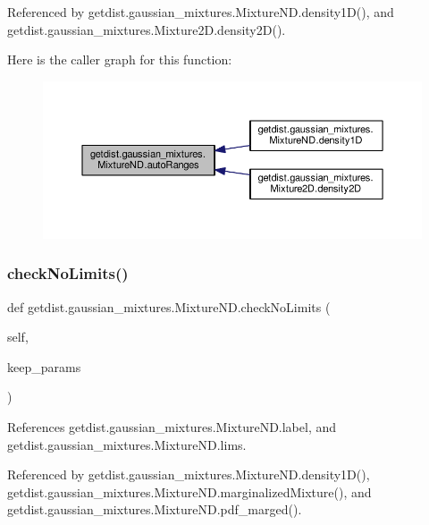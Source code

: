 Referenced by getdist.\+gaussian\+\_\+mixtures.\+Mixture\+N\+D.\+density1\+D(), and getdist.\+gaussian\+\_\+mixtures.\+Mixture2\+D.\+density2\+D().

Here is the caller graph for this function\+:
\nopagebreak
\begin{figure}[H]
\begin{center}
\leavevmode
\includegraphics[width=350pt]{classgetdist_1_1gaussian__mixtures_1_1MixtureND_aaa880a5a80583fb9f416e9fe9d99f25e_icgraph}
\end{center}
\end{figure}
\mbox{\label{classgetdist_1_1gaussian__mixtures_1_1MixtureND_a3878c180b2a99c4a7f257fea5a7a7d0f}} 
\subsubsection{\texorpdfstring{check\+No\+Limits()}{checkNoLimits()}}
{\footnotesize\ttfamily def getdist.\+gaussian\+\_\+mixtures.\+Mixture\+N\+D.\+check\+No\+Limits (\begin{DoxyParamCaption}\item[{}]{self,  }\item[{}]{keep\+\_\+params }\end{DoxyParamCaption})}



References getdist.\+gaussian\+\_\+mixtures.\+Mixture\+N\+D.\+label, and getdist.\+gaussian\+\_\+mixtures.\+Mixture\+N\+D.\+lims.



Referenced by getdist.\+gaussian\+\_\+mixtures.\+Mixture\+N\+D.\+density1\+D(), getdist.\+gaussian\+\_\+mixtures.\+Mixture\+N\+D.\+marginalized\+Mixture(), and getdist.\+gaussian\+\_\+mixtures.\+Mixture\+N\+D.\+pdf\+\_\+marged().


